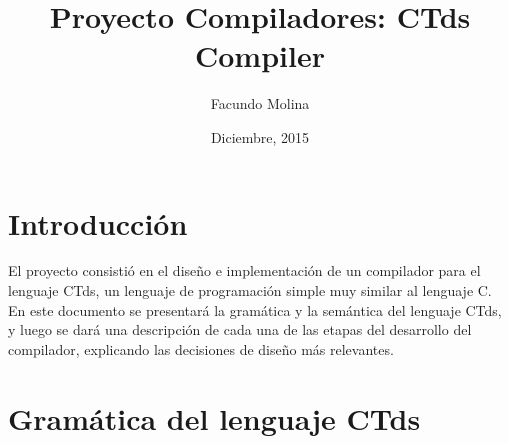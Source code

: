 \documentclass[11pt,a4paper]{article}
\author{Facundo Molina}
\begin{document}
\title{Proyecto Compiladores: CTds Compiler}
\date{Diciembre, 2015}
\maketitle

\section{Introducción}
\label{sec:intro}
El proyecto consistió en el diseño e implementación de un compilador para el lenguaje CTds, un lenguaje de programación simple muy similar al lenguaje C.  En este documento se presentará la gramática y la semántica del lenguaje CTds, y luego se dará una descripción de cada una de las etapas del desarrollo del compilador, explicando las decisiones de diseño más relevantes.

\section{Gramática del lenguaje CTds}
\label{sec:gramatica}
\end{document}
